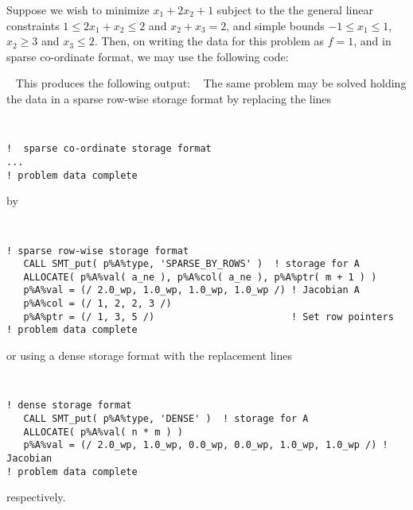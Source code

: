 \documentclass{galahad}
\begin{document}
\galexample
Suppose we wish to minimize
$x_1 + 2 x_2 + 1$
subject to the the general linear constraints
$1 \leq  2 x_{1}  +  x_{2}  \leq  2$ and
$x_{2}  +  x_{3}  =  2$, and simple bounds
$-1  \leq  x_{1}  \leq  1$, $x_2 \geq 3$  and $x_{3}  \leq  2$.
Then, on writing the data for this problem as $f = 1$,
and
in sparse co-ordinate format,
we may use the following code:

{\tt \small
\VerbatimInput{\packageexample}
}
\noindent
This produces the following output:
{\tt \small
\VerbatimInput{\packageresults}
}
\noindent
The same problem may be solved holding the data in
a sparse row-wise storage format by replacing the lines
{\tt \small
\begin{verbatim}
!  sparse co-ordinate storage format
...
! problem data complete
\end{verbatim}
}
\noindent
by
{\tt \small
\begin{verbatim}
! sparse row-wise storage format
   CALL SMT_put( p%A%type, 'SPARSE_BY_ROWS' )  ! storage for A
   ALLOCATE( p%A%val( a_ne ), p%A%col( a_ne ), p%A%ptr( m + 1 ) )
   p%A%val = (/ 2.0_wp, 1.0_wp, 1.0_wp, 1.0_wp /) ! Jacobian A
   p%A%col = (/ 1, 2, 2, 3 /)
   p%A%ptr = (/ 1, 3, 5 /)                        ! Set row pointers
! problem data complete
\end{verbatim}
}
\noindent
or using a dense storage format with the replacement lines
{\tt \small
\begin{verbatim}
! dense storage format
   CALL SMT_put( p%A%type, 'DENSE' )  ! storage for A
   ALLOCATE( p%A%val( n * m ) )
   p%A%val = (/ 2.0_wp, 1.0_wp, 0.0_wp, 0.0_wp, 1.0_wp, 1.0_wp /) ! Jacobian
! problem data complete
\end{verbatim}
}
\noindent
respectively.
\end{document}
